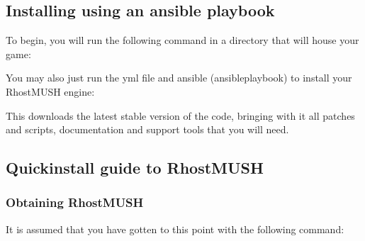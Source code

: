 \documentclass[letterpaper,10pt,english]{sphinxmanual}
\begin{document}
\subsection{Installing using an ansible playbook}
\label{\detokenize{installation:installing-using-an-ansible-playbook}}
\sphinxAtStartPar
To begin, you will run the following command in a directory that will house your game:

\begin{sphinxVerbatim}[commandchars=\\\{\}]
   
\end{sphinxVerbatim}

\sphinxAtStartPar
You may also just run the yml file and ansible (ansible\sphinxhyphen{}playbook) to install your RhostMUSH engine:

\begin{sphinxVerbatim}[commandchars=\\\{\}]
 
 
\end{sphinxVerbatim}

\sphinxAtStartPar
This downloads the latest stable version of the code, bringing with it all patches and scripts, documentation and support tools that you will need.


\subsection{Quickinstall guide to RhostMUSH}
\label{\detokenize{installation:quickinstall-guide-to-rhostmush}}

\subsubsection{Obtaining RhostMUSH}
\label{\detokenize{installation:obtaining-rhostmush}}
\sphinxAtStartPar
It is assumed that you have gotten to this point with the following command:

\begin{sphinxVerbatim}[commandchars=\\\{\}]
   
\end{sphinxVerbatim}
\end{document}
